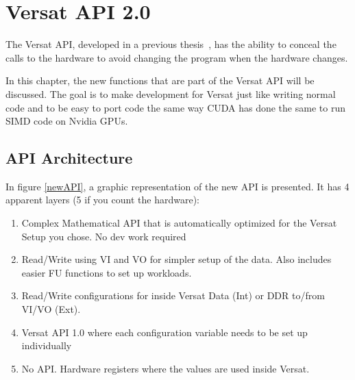 \chapter{Versat API 2.0}
\label{chapter:API}

The Versat API, developed in a previous thesis~\cite{valter:deepversat}, has the ability to conceal
the calls to the hardware to avoid changing the program when the hardware changes. 

In this chapter, the new functions that are part of the Versat API will be discussed. The goal
is to make development for Versat just like writing normal code and to be easy to port code the same way
CUDA has done the same to run SIMD code on Nvidia GPUs.



\section{API Architecture}

In figure \ref{newAPI}, a graphic representation of the new API is presented. It has 4 apparent layers (5 if you count the hardware):

\begin{enumerate}
	\item Complex Mathematical API that is automatically optimized for the Versat Setup you chose. No dev work required
	\item Read/Write using VI and VO for simpler setup of the data. Also includes easier FU functions to set up workloads.
	\item Read/Write configurations for inside Versat Data (Int) or DDR to/from VI/VO (Ext).
	\item Versat API 1.0 where each configuration variable needs to be set up individually
	\item No API. Hardware registers where the values are used inside Versat. 
  \end{enumerate}


